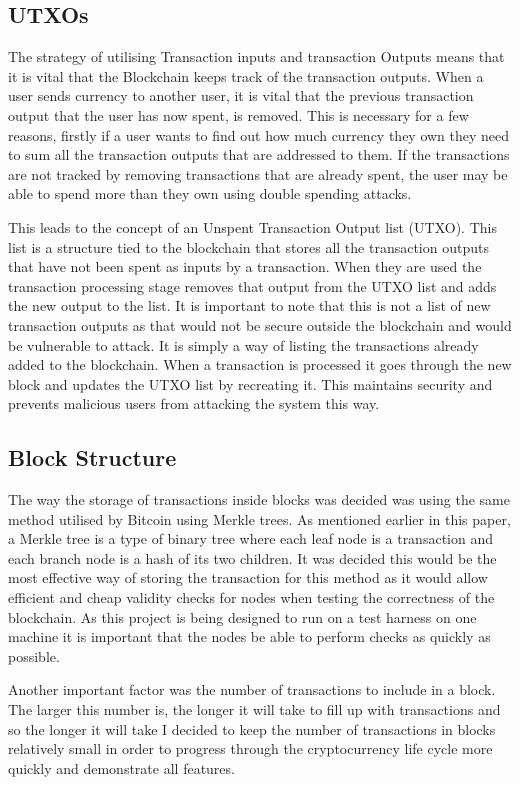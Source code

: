 \documentclass{l4proj}
\begin{document}
\subsection{UTXOs}
The strategy of utilising Transaction inputs and transaction Outputs means that it is vital that the Blockchain
keeps track of the transaction outputs. When a user sends currency to another user, it is vital that the previous 
transaction output that the user has now spent, is removed. This is necessary for a few reasons, 
firstly if a user wants to find out how much currency they own they need to sum all the transaction outputs that 
are addressed to them. If the transactions are not tracked by removing transactions that are already spent, the 
user may be able to spend more than they own using double spending attacks.

This leads to the concept of an Unspent Transaction Output list (UTXO). This list is a structure tied to the blockchain
that stores all the transaction outputs that have not been spent as inputs by a transaction. When they are used 
the transaction processing stage removes that output from the UTXO list and adds the new output to the list.
It is important to note that this is not a list of new transaction outputs as that would not be secure outside the
blockchain and would be vulnerable to attack. It is simply a way of listing the transactions already added to the
blockchain. When a transaction is processed it goes through the new block and updates the UTXO list by recreating 
it. This maintains security and prevents malicious users from attacking the system this way.

\subsection{Block Structure}
The way the storage of transactions inside blocks was decided was using the same method utilised by Bitcoin using
Merkle trees. As mentioned earlier in this paper, a Merkle tree is a type of binary tree where each leaf node
is a transaction and each branch node is a hash of its two children. It was decided this would be the most effective
way of storing the transaction for this method as it would allow efficient and cheap validity checks for nodes
when testing the correctness of the blockchain. As this project is being designed to run on a test harness on one
machine it is important that the nodes be able to perform checks as quickly as possible.

Another important factor was the number of transactions to include in a block. The larger this number is, the
longer it will take to fill up with transactions and so the longer it will take I decided to keep the 
number of transactions in blocks relatively small in order to progress through the cryptocurrency life cycle
more quickly and demonstrate all features.
\end{document}
